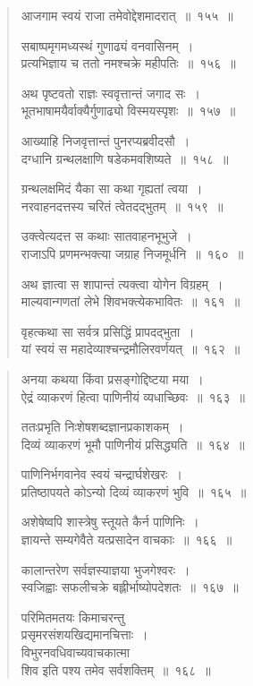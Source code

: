 \documentclass[11pt, openany]{book}
\begin{document}
\begin{multicols}{2}
\begin{quote}
{\mbh आजगाम स्वयं राजा तमेवोद्देशमादरात्~॥~१५५~॥

सबाष्पमृगमध्यस्थं गुणाढ्यं वनवासिनम्~।\\
प्रत्यभिज्ञाय च ततो नमश्चक्रे महीपतिः~॥~१५६~॥

अथ पृष्टवतो राज्ञः स्ववृत्तान्तं जगाद सः~।\\
भूतभाषामयैर्वाक्यैर्गुणाढ्यो विस्मयस्पृशः~॥~१५७~॥

आख्याहि निजवृत्तान्तं पुनरप्यब्रवीदसौ~।\\
दग्धानि ग्रन्थलक्षाणि षडेकमवशिष्यते~॥~१५८~॥

ग्रन्थलक्षमिदं यैका सा कथा गृह्यतां त्वया~।\\
नरवाहनदत्तस्य चरितं त्वेतदद्भुतम्~॥~१५९~॥

उक्त्वेत्यदत्त स कथाः सातवाहनभूभुजे~।\\
राजाऽपि प्रणमन्भक्त्या जग्राह निजमूर्धनि~॥~१६०~॥

अथ ज्ञात्वा स शापान्तं त्यक्त्वा योगेन विग्रहम्~।\\
माल्यवान्गणतां लेभे शिवभक्त्येकभावितः~॥~१६१~॥

वृहत्कथा सा सर्वत्र प्रसिद्धिं प्रापदद्भुता~।\\
यां स्वयं स महादेव्याश्चन्द्रमौलिरवर्णयत्~॥~१६२~॥}
\end{quote}

\columnbreak

\begin{quote}
{\mbh अनया कथया किंवा प्रसङ्गोद्दिष्टया मया~।\\
ऐद्रं व्याकरणं हित्वा पाणिनीयं व्यधाच्छिवः~॥~१६३~॥

ततःप्रभृति निःशेषशब्दज्ञानप्रकाशकम्~।\\
दिव्यं व्याकरणं भूमौ पाणिनीयं प्रसिद्ध्यति~॥~१६४~॥

पाणिनिर्भगवानेव स्वयं चन्द्रार्घशेखरः~।\\
प्रतिष्ठापयते कोऽन्यो दिव्यं व्याकरणं भुवि~॥~१६५~॥

अशेषेष्वपि शास्त्रेषु स्तूयते कैर्न पाणिनिः~।\\
ज्ञायन्ते सम्यगेवैते यत्प्रसादेन वाचकाः~॥~१६६~॥

कालान्तरेण सर्वज्ञस्याज्ञया भुजगेश्वरः~।\\
स्वजिह्वाः सफलीचक्रे बह्लीर्भाष्योपदेशतः~॥~१६७~॥

परिमितमतयः किमाचरन्तु \\
प्रसृमरसंशयखिद्यमानचित्ताः~।\\
विभुरनवधिवाच्यवाचकात्मा \\
शिव इति पश्य तमेव सर्वशक्तिम्~॥~१६८~॥}
\end{quote}
\end{multicols}
\end{document}
